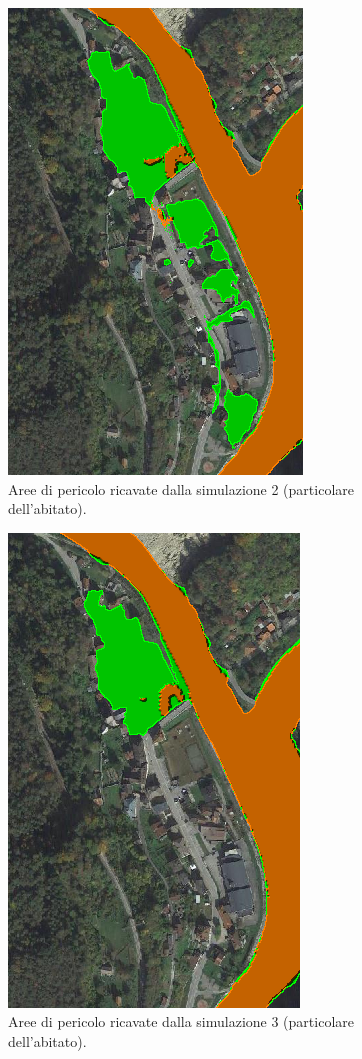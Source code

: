 \begin{figure}[H] \centering
    \includegraphics[scale=0.5]{immagini/part_aree_pericolo_2.png}
    \caption{Aree di pericolo ricavate dalla simulazione 2 (particolare dell'abitato).}
    \label{figure:part_aree_pericolo_2}
\end{figure}

\begin{figure}[H] \centering
    \includegraphics[scale=0.5]{immagini/part_aree_pericolo_3.png}
    \caption{Aree di pericolo ricavate dalla simulazione 3 (particolare dell'abitato).}
    \label{figure:part_aree_pericolo_3}
\end{figure}

